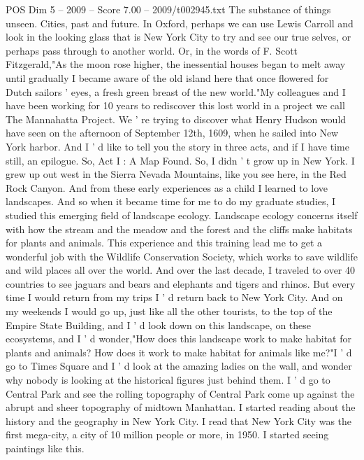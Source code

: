 \begin{textsample}{POS Dim 5 – 2009 – Score 7.00 – 2009/t002945.txt}  \label{ex:f5_pos_036}
The substance of things unseen.
Cities, past and future.
In Oxford, perhaps we can use Lewis Carroll and look in the looking glass that is New York City to try and see our true selves, or perhaps pass through to another world.
Or, in the words of F.
Scott Fitzgerald,"As the moon rose higher, the inessential houses began to melt away until gradually I became aware of the old island here that once flowered for Dutch sailors ' eyes, a fresh green breast of the new world."My colleagues and I have been working for 10 years to rediscover this lost world in a project we call The Mannahatta Project.
We ' re trying to discover what Henry Hudson would have seen on the afternoon of September 12th, 1609, when he sailed into New York harbor.
And I ' d like to tell you the story in three acts, and if I have time still, an epilogue.
So, Act I : A Map Found.
So, I didn ' t grow up in New York.
I grew up out west in the Sierra Nevada Mountains, like you see here, in the Red Rock Canyon.
And from these early experiences as a child I learned to love landscapes.
And so when it became time for me to do my graduate studies, I studied this emerging field of landscape ecology.
Landscape ecology concerns itself with how the stream and the meadow and the forest and the cliffs make habitats for plants and animals.
This experience and this training lead me to get a wonderful job with the Wildlife Conservation Society, which works to save wildlife and wild places all over the world.
And over the last decade, I traveled to over 40 countries to see jaguars and bears and elephants and tigers and rhinos.
But every time I would return from my trips I ' d return back to New York City.
And on my weekends I would go up, just like all the other tourists, to the top of the Empire State Building, and I ' d look down on this landscape, on these ecosystems, and I ' d wonder,"How does this landscape work to make habitat for plants and animals?
How does it work to make habitat for animals like me?"I ' d go to Times Square and I ' d look at the amazing ladies on the wall, and wonder why nobody is looking at the historical figures just behind them.
I ' d go to Central Park and see the rolling topography of Central Park come up against the abrupt and sheer topography of midtown Manhattan.
I started reading about the history and the geography in New York City.
I read that New York City was the first mega-city, a city of 10 million people or more, in 1950.
I started seeing paintings like this.

\end{textsample}
